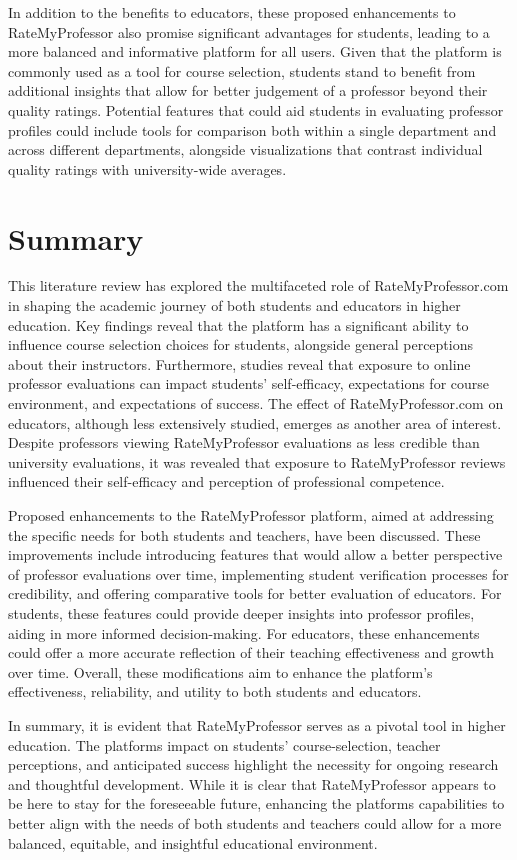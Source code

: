 \documentclass[twocolumn, doc,12pt]{apa7}
\begin{document}
In addition to the benefits to educators, these proposed enhancements to RateMyProfessor also promise significant advantages for students, leading to a more balanced and informative platform for all users. Given that the platform is commonly used as a tool for course selection, students stand to benefit from additional insights that allow for better judgement of a professor beyond their quality ratings. Potential features that could aid students in evaluating professor profiles could include tools for comparison both within a single department and across different departments, alongside visualizations that contrast individual quality ratings with university-wide averages.

\section{Summary}
This literature review has explored the multifaceted role of RateMyProfessor.com in shaping the academic journey of both students and educators in higher education. Key findings reveal that the platform has a significant ability to influence course selection choices for students, alongside general perceptions about their instructors. Furthermore, studies reveal that exposure to online professor evaluations can impact students' self-efficacy, expectations for course environment, and expectations of success. The effect of RateMyProfessor.com on educators, although less extensively studied, emerges as another area of interest. Despite professors viewing RateMyProfessor evaluations as less credible than university evaluations, it was revealed that exposure to RateMyProfessor reviews influenced their self-efficacy and perception of professional competence.

Proposed enhancements to the RateMyProfessor platform, aimed at addressing the specific needs for both students and teachers, have been discussed. These improvements include introducing features that would allow a better perspective of professor evaluations over time, implementing student verification processes for credibility, and offering comparative tools for better evaluation of educators. For students, these features could provide deeper insights into professor profiles, aiding in more informed decision-making. For educators, these enhancements could offer a more accurate reflection of their teaching effectiveness and growth over time. Overall, these modifications aim to enhance the platform's effectiveness, reliability, and utility to both students and educators.

In summary, it is evident that RateMyProfessor serves as a pivotal tool in higher education. The platforms impact on students' course-selection, teacher perceptions, and anticipated success highlight the necessity for ongoing research and thoughtful development. While it is clear that RateMyProfessor appears to be here to stay for the foreseeable future, enhancing the platforms capabilities to better align with the needs of both students and teachers could allow for a more balanced, equitable, and insightful educational environment.

\printbibliography
\end{document}
